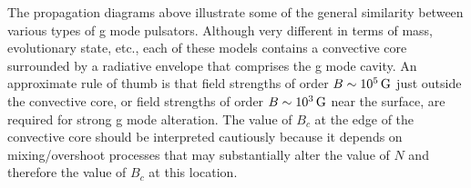 The propagation diagrams above illustrate some of the general similarity between various types of g mode pulsators. Although very different in terms of mass, evolutionary state, etc., each of these models contains a convective core surrounded by a radiative envelope that comprises the g mode cavity. An approximate rule of thumb is that field strengths of order $B \sim 10^5 \, {\rm G}$ just outside the convective core, or field strengths of order $B \sim 10^3 \, {\rm G}$ near the surface, are required for strong g mode alteration. The value of $B_c$ at the edge of the convective core should be interpreted cautiously because it depends on mixing/overshoot processes that may substantially alter the value of $N$ and therefore the value of $B_c$ at this location.